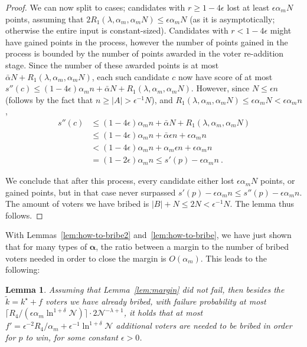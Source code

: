 \documentclass[letterpaper]{article} %
\newtheorem{lemma}[theorem]{Lemma}
\theoremstyle{definition}
\newcommand{\abs}[1]{\lvert #1 \rvert}
\newcommand{\NN}{\mathcal{N}}
\newcommand\vecgreek{\bm}
\newcommand{\veca}{\vecgreek{\alpha}}
\begin{document}
\begin{proof}
	We can now split to cases; candidates with $r\geq 1-4\epsilon$ lost at least $\epsilon \alpha_m N$ points, assuming that  $2R_1(\lambda, \alpha_{m}, \alpha_m N) \leq\epsilon \alpha_m N$ (as it is asymptotically; otherwise the entire input is constant-sized). 
	Candidates with $r<  1-4\epsilon$ might have gained points in the process, however the number of points gained in the process is bounded by the number of points awarded in the voter re-addition stage. Since the number of these awarded points is at most  $\bar{\alpha}N + R_1(\lambda, \alpha_{m}, \alpha_m N)$, each such candidate $c$ now have score of at most $s''(c) \leq (1-4\epsilon)\alpha_mn + \bar{\alpha} N + R_1(\lambda, \alpha_{m}, \alpha_m N)$. However,  since $N \leq \epsilon n$ (follows by the fact that $n \geq \abs{A}> \epsilon^{-1}N$), and $R_1(\lambda, \alpha_{m}, \alpha_m N) \leq\epsilon \alpha_m N < \epsilon \alpha_m n$, 
	\begin{align*}
	s''(c) &\leq (1-4\epsilon)\alpha_m n + \bar{\alpha} N+ R_1(\lambda, \alpha_{m}, \alpha_m N)\\
	&\leq (1-4\epsilon)\alpha_m n + \bar{\alpha} \epsilon n+ \epsilon \alpha_m n\\
	&< (1-4\epsilon)\alpha_m n + \alpha_m \epsilon n + \epsilon \alpha_m n\\
	&= (1-2\epsilon)\alpha_m n  \leq s'(p) - \epsilon\alpha_m n \ .
	\end{align*}
	
	We conclude that after this process, every candidate either lost $\epsilon \alpha_m N$ points, or gained points, but in that case never surpassed $s'(p) - \epsilon\alpha_m n \leq s''(p) - \epsilon\alpha_m n$. The amount of voters we have bribed is $\abs{B} + N \leq 2N < \epsilon^{-1}N$. The lemma thus follows.	
\end{proof}
With Lemmas~\ref{lem:how-to-bribe2} and~\ref{lem:how-to-bribe}, we have just shown that for many types of $\veca$, the ratio between a margin to the number of bribed voters needed in order to close the margin is $O(\alpha_m)$.
This leads to the following:
\begin{lemma}\label{lem:f'}
	Assuming that Lemma~\ref{lem:margin} did not fail, then besides the $\tilde{k}= k^\star +f$ voters we have already bribed, with failure probability at most $\lceil R_4/(\epsilon \alpha_m \ln^{1+\delta}\NN)\rceil \cdot 2\NN^{-\lambda+1}$, it  holds that
	at most $f'=\epsilon^{-2} R_4 / \alpha_m + \epsilon^{-1}\ln^{1+\delta}\NN $ additional voters are needed to be bribed in order for $p$ to win, for some constant $\epsilon > 0$.
\end{lemma}
\end{document}
